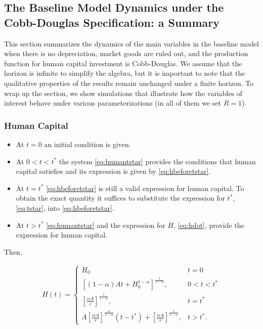 \subsection{The Baseline Model Dynamics under the Cobb-Douglas Specification: a Summary}
This section summarizes the dynamics of the main variables in the baseline model when there is no depreciation, market goods are ruled out, and the production function for human capital investment is Cobb-Douglas. We assume that the horizon is infinite to simplify the algebra, but it is important to note that the qualitative properties of the results remain unchanged under a finite horizon. To wrap up the section, we show simulations that illustrate how the variables of interest behave under various parameterizations (in all of them we set $R = 1$). 

\subsubsection{Human Capital}
\begin{itemize}
\item At $t = 0$ an initial condition is given.
\item At $0 < t < t^*$ the system \eqref{eq:humantstar} provides the conditions that human capital satisfies and its expression is given by \eqref{eq:hbeforetstar}.
\item At $t = t^*$ \eqref{eq:hbeforetstar} is still a valid expression for human capital. To obtain the exact quantity it suffices to substitute the expression for $t^*$, \eqref{eq:tstar}, into \eqref{eq:hbeforetstar}.
\item At $ t > t^* $ \eqref{eq:humantstar} and the expression for $\dot{H}$, \eqref{eq:hdot}, provide the expression for human capital.
\end{itemize}

Then,

\begin{eqnarray}
H(t) =
\begin{cases}
H_{0} & t = 0 \\
\left[ (1 - \alpha)At + H_{0}^{1-\alpha} \right]^{\frac{1}{1-\alpha}} , & 0 < t < t^* \\
\left[ \frac{\alpha A}{r} \right]^{\frac{1}{1 - \alpha}}, & t = t^* \\
A \left[ \frac{\alpha A}{r} \right]^{\frac{ \alpha }{1 - \alpha}} \left( t - t^* \right) + \left[ \frac{\alpha A}{r} \right]^{\frac{1}{1 - \alpha}} , & t > t^*. \label{eq:humancapall}
\end{cases}
\end{eqnarray}

